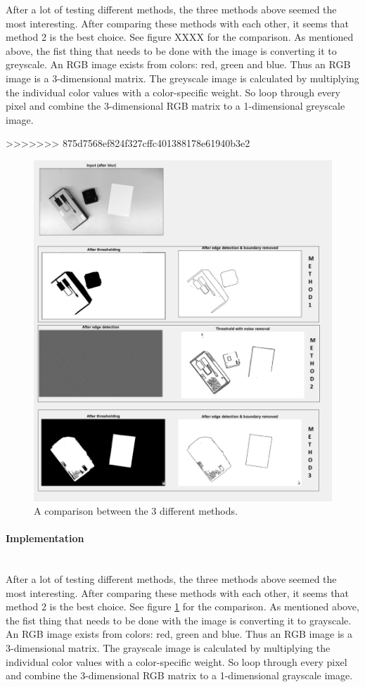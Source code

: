 \documentclass[11pt]{article}
\begin{document}
After a lot of testing different methods, the three methods above seemed the most interesting. After comparing these methods with each other, it seems that method 2 is the best choice. See figure XXXX for the comparison. As mentioned above, the fist thing that needs to be done with the image is converting it to greyscale. An RGB image exists from colors: red, green and blue. Thus an RGB image is a 3-dimensional matrix. The greyscale image is calculated by multiplying the individual color values with a color-specific weight. So loop through every pixel and combine the 3-dimensional RGB matrix to a 1-dimensional greyscale image.

>>>>>>> 875d7568ef824f327cffc401388178e61940b3e2
\begin{figure}[h]
	\center
  \includegraphics[width=0.7\linewidth]{comparison_methods.png}
  \caption{A comparison between the 3 different methods.}
  \label{fig:comparison_methods}
\end{figure}

\paragraph{Implementation}\mbox{}\\
After a lot of testing different methods, the three methods above seemed the most interesting. After comparing these methods with each other, it seems that method 2 is the best choice. See figure \ref{fig:comparison_methods} for the comparison. As mentioned above, the fist thing that needs to be done with the image is converting it to grayscale. An RGB image exists from colors: red, green and blue. Thus an RGB image is a 3-dimensional matrix. The grayscale image is calculated by multiplying the individual color values with a color-specific weight. So loop through every pixel and combine the 3-dimensional RGB matrix to a 1-dimensional grayscale image.
\end{document}
